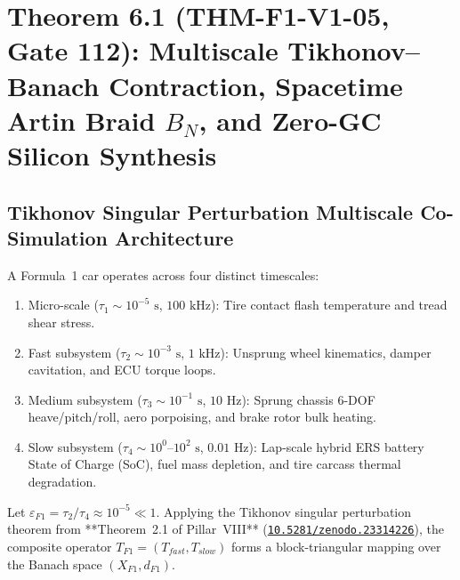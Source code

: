 \documentclass[11pt,a4paper,reqno]{article}
\def\texttt#1{#1}%
\def\mathrm#1{#1}%
\def\mathcal#1{#1}%
\newcommand{\zenodo}[1]{\href{https://doi.org/10.5281/zenodo.#1}{\nolinkurl{10.5281/zenodo.#1}}}
\theoremstyle{plain}
\theoremstyle{definition}
\theoremstyle{remark}
\numberwithin{equation}{section}
\begin{document}
\section{\texorpdfstring{Theorem 6.1 (\texttt{THM-F1-V1-05}, Gate 112): Multiscale Tikhonov--Banach Contraction, Spacetime Artin Braid $\mathcal{B}_N$, and Zero-GC Silicon Synthesis}{Theorem 6.1 (THM-F1-V1-05, Gate 112): Multiscale Tikhonov-Banach Contraction, Spacetime Artin Braid B\_N, and Zero-GC Silicon Synthesis}}

\subsection{Tikhonov Singular Perturbation Multiscale Co-Simulation Architecture}
A Formula~1 car operates across four distinct timescales:
\begin{enumerate}
  \item Micro-scale ($\tau_1 \sim 10^{-5}\text{ s}$, $100\text{ kHz}$): Tire contact flash temperature and tread shear stress.
  \item Fast subsystem ($\tau_2 \sim 10^{-3}\text{ s}$, $1\text{ kHz}$): Unsprung wheel kinematics, damper cavitation, and ECU torque loops.
  \item Medium subsystem ($\tau_3 \sim 10^{-1}\text{ s}$, $10\text{ Hz}$): Sprung chassis 6-DOF heave/pitch/roll, aero porpoising, and brake rotor bulk heating.
  \item Slow subsystem ($\tau_4 \sim 10^0\text{--}10^2\text{ s}$, $0.01\text{ Hz}$): Lap-scale hybrid ERS battery State of Charge (SoC), fuel mass depletion, and tire carcass thermal degradation.
\end{enumerate}

Let $\varepsilon_{\mathrm{F1}} = \tau_2 / \tau_4 \approx 10^{-5} \ll 1$. Applying the Tikhonov singular perturbation theorem from **Theorem~2.1 of Pillar~VIII** (\zenodo{23314226}), the composite operator $\mathcal{T}_{\mathrm{F1}} = (\mathcal{T}_{\mathrm{fast}}, \mathcal{T}_{\mathrm{slow}})$ forms a block-triangular mapping over the Banach space $(\mathcal{X}_{\mathrm{F1}}, d_{\mathrm{F1}})$.
\end{document}
